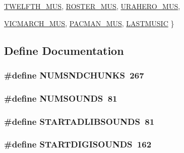 \begin{DoxyCompactItemize}
\hyperlink{BUDIOWL6_8H_a196fbe29c4c02d90973f0b611ed0958ba2daba453f800e809bfb4fca6124da377}{TWELFTH\_\-MUS}, 
\hyperlink{BUDIOWL6_8H_a196fbe29c4c02d90973f0b611ed0958ba69e9e273ab13839b09e0976829002046}{ROSTER\_\-MUS}, 
\hyperlink{BUDIOWL6_8H_a196fbe29c4c02d90973f0b611ed0958ba7a71704b46eb8baaa32e6f817634328d}{URAHERO\_\-MUS}, 
\par
\hyperlink{BUDIOWL6_8H_a196fbe29c4c02d90973f0b611ed0958ba26a6deb65452e9b3f46d3e8571d2d2f7}{VICMARCH\_\-MUS}, 
\hyperlink{BUDIOWL6_8H_a196fbe29c4c02d90973f0b611ed0958ba69e6ef1a3a2ca4f191c98b37d6a8f0a9}{PACMAN\_\-MUS}, 
\hyperlink{BUDIOWL6_8H_a196fbe29c4c02d90973f0b611ed0958ba4c2fa07a163e141352f7e828f629dd59}{LASTMUSIC}
 \}
\end{DoxyCompactItemize}


\subsection{Define Documentation}
\hypertarget{AUDIOSOD_8H_adb660029e11963733384781d8bd6dc24}{
\subsubsection[{NUMSNDCHUNKS}]{\setlength{\rightskip}{0pt plus 5cm}\#define NUMSNDCHUNKS~267}}
\label{AUDIOSOD_8H_adb660029e11963733384781d8bd6dc24}
\hypertarget{AUDIOSOD_8H_aa948e91a657468d5faa690ec1a89230b}{
\subsubsection[{NUMSOUNDS}]{\setlength{\rightskip}{0pt plus 5cm}\#define NUMSOUNDS~81}}
\label{AUDIOSOD_8H_aa948e91a657468d5faa690ec1a89230b}
\hypertarget{AUDIOSOD_8H_a7d40bf6bf62cde9ae5f212e063328200}{
\subsubsection[{STARTADLIBSOUNDS}]{\setlength{\rightskip}{0pt plus 5cm}\#define STARTADLIBSOUNDS~81}}
\label{AUDIOSOD_8H_a7d40bf6bf62cde9ae5f212e063328200}
\hypertarget{AUDIOSOD_8H_adb5a42984ba81d350a944cc41434a6f7}{
\subsubsection[{STARTDIGISOUNDS}]{\setlength{\rightskip}{0pt plus 5cm}\#define STARTDIGISOUNDS~162}}
